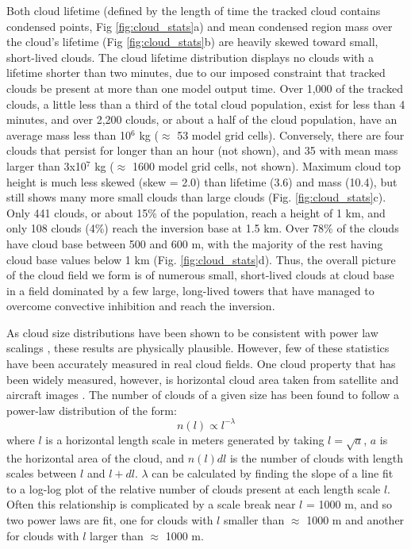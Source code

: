 \documentclass[acp]{copernicus}
\begin{document}
Both cloud lifetime (defined by the length of time the tracked cloud contains 
condensed points, Fig \ref{fig:cloud_stats}a) and mean condensed region mass 
over the cloud's lifetime (Fig \ref{fig:cloud_stats}b) are heavily skewed 
toward small, short-lived clouds.  The cloud lifetime distribution displays no 
clouds with a lifetime shorter than two minutes, due to our imposed constraint 
that tracked clouds be present at more than one model output time.  Over 1,000 
of the tracked clouds, a little less than a third of the total cloud 
population, exist for less than 4 minutes, and over 2,200 clouds, or about a 
half of the cloud population, have an average mass less than 10$^6$ kg 
($\approx$ 53 model grid cells).  Conversely, there are four clouds that 
persist for longer than an hour (not shown), and 35 with mean mass larger than 
3x10$^7$ kg ($\approx$ 1600 model grid cells, not shown).  Maximum cloud 
top height is much less skewed (skew = 2.0) than lifetime (3.6) and mass 
(10.4), but still shows many more small clouds than large clouds (Fig. 
\ref{fig:cloud_stats}c).  Only 441 clouds, or about 15\% of the population, 
reach a height of 1 km, and only 108 clouds (4\%) reach the inversion base at 
1.5 km.  Over 78\% of the clouds have cloud base between 500 and 600 m, with 
the majority of the rest having cloud base values below 1 km (Fig. 
\ref{fig:cloud_stats}d).  Thus, the overall picture of the cloud field we form 
is of numerous small, short-lived clouds at cloud base in a field dominated by 
a few large, long-lived towers that have managed to overcome convective 
inhibition and reach the inversion.

As cloud size distributions have been shown to be consistent with power law 
scalings \citep{Benner1998, Zhao2007}, these results are physically plausible. 
However, few of these statistics have been accurately measured in real cloud 
fields. One cloud property that has been widely measured, however, is 
horizontal cloud area taken from satellite and aircraft images 
\citep{Benner1998, Cahalan1989, Neggers2003, Neggers2003a, Zhao2007, 
Jiang2008}.  The number of clouds of a given size has been found to follow a 
power-law distribution of the form:
\begin{equation}
n(l) \propto l^{-\lambda}
\end{equation}
where $l$ is a horizontal length scale in meters generated by taking 
$l=\sqrt{a}$, $a$ is the horizontal area of the cloud, and $n(l)dl$ is the 
number of clouds with length scales between $l$ and $l+dl$.  $\lambda$ can 
be calculated by finding the slope of a line fit to a log-log plot of the 
relative number of clouds present at each length scale $l$.  Often this 
relationship is complicated by a scale break near $l$ = 1000 m, and so two 
power laws are fit, one for clouds with $l$ smaller than $\approx$ 1000 m and 
another for clouds with $l$ larger than $\approx$ 1000 m.
\end{document}
